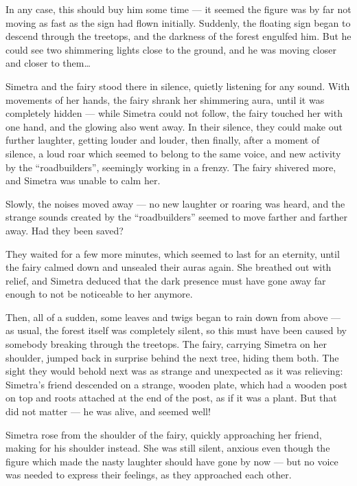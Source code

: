 In any case, this should buy him some time --- it seemed the figure was by far not moving as fast as the sign had flown initially. Suddenly, the floating sign began to descend through the treetops, and the darkness of the forest engulfed him. But he could see two shimmering lights close to the ground, and he was moving closer and closer to them\dots

\froufrou{}

Simetra and the fairy stood there in silence, quietly listening for any sound. With movements of her hands, the fairy shrank her shimmering aura, until it was completely hidden --- while Simetra could not follow, the fairy touched her with one hand, and the glowing also went away. In their silence, they could make out further laughter, getting louder and louder, then finally, after a moment of silence, a loud roar which seemed to belong to the same voice, and new activity by the \enquote{roadbuilders}, seemingly working in a frenzy. The fairy shivered more, and Simetra was unable to calm her.

Slowly, the noises moved away --- no new laughter or roaring was heard, and the strange sounds created by the \enquote{roadbuilders} seemed to move farther and farther away. Had they been saved?

They waited for a few more minutes, which seemed to last for an eternity, until the fairy calmed down and unsealed their auras again. She breathed out with relief, and Simetra deduced that the dark presence must have gone away far enough to not be noticeable to her anymore.

Then, all of a sudden, some leaves and twigs began to rain down from above --- as usual, the forest itself was completely silent, so this must have been caused by somebody breaking through the treetops. The fairy, carrying Simetra on her shoulder, jumped back in surprise behind the next tree, hiding them both. The sight they would behold next was as strange and unexpected as it was relieving: Simetra's friend descended on a strange, wooden plate, which had a wooden post on top and roots attached at the end of the post, as if it was a plant. But that did not matter --- he was alive, and seemed well!

Simetra rose from the shoulder of the fairy, quickly approaching her friend, making for his shoulder instead. She was still silent, anxious even though the figure which made the nasty laughter should have gone by now --- but no voice was needed to express their feelings, as they approached each other.

